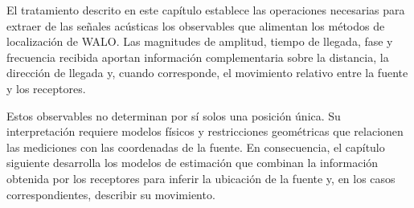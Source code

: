 El tratamiento descrito en este capítulo establece las operaciones
necesarias para extraer de las señales acústicas los observables que
alimentan los métodos de localización de WALO. Las magnitudes de
amplitud, tiempo de llegada, fase y frecuencia recibida aportan
información complementaria sobre la distancia, la dirección de llegada
y, cuando corresponde, el movimiento relativo entre la fuente y los
receptores.

Estos observables no determinan por sí solos una posición única. Su
interpretación requiere modelos físicos y restricciones geométricas
que relacionen las mediciones con las coordenadas de la fuente. En
consecuencia, el capítulo siguiente desarrolla los modelos de estimación
que combinan la información obtenida por los receptores para inferir
la ubicación de la fuente y, en los casos correspondientes, describir
su movimiento.

